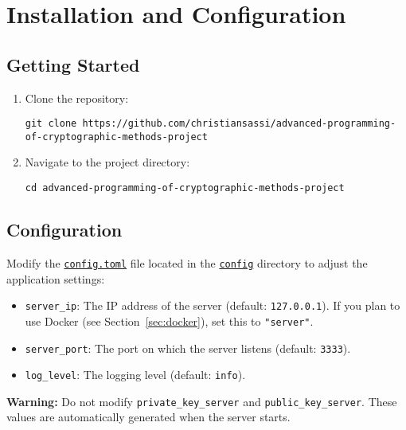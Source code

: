 \chapter{Installation and Configuration}
\label{cha:Installation}

\section{Getting Started}

\begin{enumerate}
    \item Clone the repository:

        \begin{lstlisting}
git clone https://github.com/christiansassi/advanced-programming-of-cryptographic-methods-project
        \end{lstlisting}

    \item Navigate to the project directory:
    
        \begin{lstlisting}
cd advanced-programming-of-cryptographic-methods-project
        \end{lstlisting}
\end{enumerate}

\section{Configuration}

Modify the \href{https://github.com/christiansassi/advanced-programming-of-cryptographic-methods-project/blob/main/config/config.toml}{\texttt{config.toml}} file located in the \href{https://github.com/christiansassi/advanced-programming-of-cryptographic-methods-project/blob/main/config}{\texttt{config}} directory to adjust the application settings:

\begin{itemize}
    \item \texttt{server\_ip}: The IP address of the server (default: \texttt{127.0.0.1}). If you plan to use Docker (see Section~\ref{sec:docker}), set this to \texttt{"server"}.
    \item \texttt{server\_port}: The port on which the server listens (default: \texttt{3333}).
    \item \texttt{log\_level}: The logging level (default: \texttt{info}).
\end{itemize}

\noindent
\begin{myWarning}
\textbf{Warning:} Do not modify \texttt{private\_key\_server} and \texttt{public\_key\_server}. These values are automatically generated when the server starts.
\end{myWarning}

